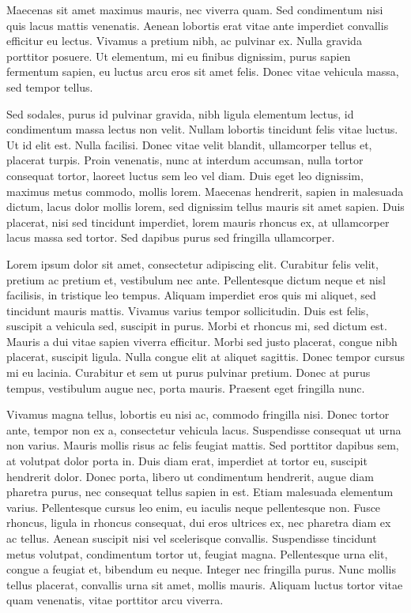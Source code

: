Maecenas sit amet maximus mauris, nec viverra quam. Sed condimentum nisi quis lacus mattis venenatis. Aenean lobortis erat vitae ante imperdiet convallis efficitur eu lectus. Vivamus a pretium nibh, ac pulvinar ex. Nulla gravida porttitor posuere. Ut elementum, mi eu finibus dignissim, purus sapien fermentum sapien, eu luctus arcu eros sit amet felis. Donec vitae vehicula massa, sed tempor tellus.

Sed sodales, purus id pulvinar gravida, nibh ligula elementum lectus, id condimentum massa lectus non velit. Nullam lobortis tincidunt felis vitae luctus. Ut id elit est. Nulla facilisi. Donec vitae velit blandit, ullamcorper tellus et, placerat turpis. Proin venenatis, nunc at interdum accumsan, nulla tortor consequat tortor, laoreet luctus sem leo vel diam. Duis eget leo dignissim, maximus metus commodo, mollis lorem. Maecenas hendrerit, sapien in malesuada dictum, lacus dolor mollis lorem, sed dignissim tellus mauris sit amet sapien. Duis placerat, nisi sed tincidunt imperdiet, lorem mauris rhoncus ex, at ullamcorper lacus massa sed tortor. Sed dapibus purus sed fringilla ullamcorper.

Lorem ipsum dolor sit amet, consectetur adipiscing elit. Curabitur felis velit, pretium ac pretium et, vestibulum nec ante. Pellentesque dictum neque et nisl facilisis, in tristique leo tempus. Aliquam imperdiet eros quis mi aliquet, sed tincidunt mauris mattis. Vivamus varius tempor sollicitudin. Duis est felis, suscipit a vehicula sed, suscipit in purus. Morbi et rhoncus mi, sed dictum est. Mauris a dui vitae sapien viverra efficitur. Morbi sed justo placerat, congue nibh placerat, suscipit ligula. Nulla congue elit at aliquet sagittis. Donec tempor cursus mi eu lacinia. Curabitur et sem ut purus pulvinar pretium. Donec at purus tempus, vestibulum augue nec, porta mauris. Praesent eget fringilla nunc.

Vivamus magna tellus, lobortis eu nisi ac, commodo fringilla nisi. Donec tortor ante, tempor non ex a, consectetur vehicula lacus. Suspendisse consequat ut urna non varius. Mauris mollis risus ac felis feugiat mattis. Sed porttitor dapibus sem, at volutpat dolor porta in. Duis diam erat, imperdiet at tortor eu, suscipit hendrerit dolor. Donec porta, libero ut condimentum hendrerit, augue diam pharetra purus, nec consequat tellus sapien in est. Etiam malesuada elementum varius. Pellentesque cursus leo enim, eu iaculis neque pellentesque non. Fusce rhoncus, ligula in rhoncus consequat, dui eros ultrices ex, nec pharetra diam ex ac tellus. Aenean suscipit nisi vel scelerisque convallis. Suspendisse tincidunt metus volutpat, condimentum tortor ut, feugiat magna. Pellentesque urna elit, congue a feugiat et, bibendum eu neque. Integer nec fringilla purus. Nunc mollis tellus placerat, convallis urna sit amet, mollis mauris. Aliquam luctus tortor vitae quam venenatis, vitae porttitor arcu viverra.

